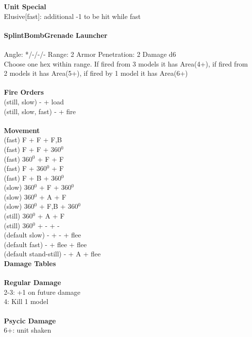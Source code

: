 {\bf Unit Special} \\
Elusive[fast]: additional -1 to be hit while fast
\ \\
\ \\
{\bf SplintBombGrenade Launcher } \\
\ \\
Angle: */-/-/- Range: 2 Armor Penetration: 2 Damage d6 \\
\indent Choose one hex within range. If fired from 3 models it has Area(4+), if fired from 2 models it has Area(5+), if fired by 1 model it has Area(6+) \\





\ \\ {\bf Fire Orders } \\
(still, slow) - + load \\
(still, slow, fast) - + fire \\
\ \\ {\bf Movement } \\
(fast) F + F + F,B  \\
(fast) F + F + 360$^0$ \\
(fast) 360$^0$ + F + F \\
(fast) F + 360$^0$ + F \\
(fast) F + B + 360$^0$ \\
(slow) 360$^0$ + F + 360$^0$ \\
(slow) 360$^0$ + A + F \\
(slow) 360$^0$ + F,B + 360$^0$ \\
(still) 360$^0$ + A + F \\
(still) 360$^0$ + - + -  \\
(default slow) - + - + flee \\
(default fast) - + flee + flee \\
(default stand-still) - + A + flee \\



{\bf Damage Tables} \\
\ \\ {\bf Regular Damage } \\
2-3: +1 on future damage \\
4: Kill 1 model \\
\ \\ {\bf Psycic Damage } \\
6+: unit shaken \\









